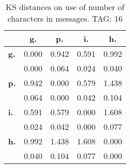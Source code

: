 \begin{table}[h!]
\begin{center}
\begin{tabular}{| l || c | c | c | c |}\hline
 & {\bf g.} & {\bf p.} & {\bf i.} & {\bf h.} \\\hline\hline
{\bf g.} & 0.000 & 0.942 & 0.591 & 0.992 \\
{\bf } & 0.000 & 0.064 & 0.024 & 0.040 \\\hline
{\bf p.} & 0.942 & 0.000 & 0.579 & 1.438 \\
{\bf } & 0.064 & 0.000 & 0.042 & 0.104 \\\hline
{\bf i.} & 0.591 & 0.579 & 0.000 & 1.608 \\
{\bf } & 0.024 & 0.042 & 0.000 & 0.077 \\\hline
{\bf h.} & 0.992 & 1.438 & 1.608 & 0.000 \\
{\bf } & 0.040 & 0.104 & 0.077 & 0.000 \\\hline
\end{tabular}
\caption{KS distances on use of number of characters in messages. TAG: 16}
\end{center}
\end{table}
